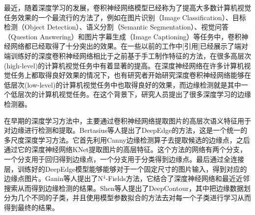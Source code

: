\documentclass[master]{thesis-uestc}
\begin{document}
最近，随着深度学习的发展，卷积神经网络模型已经称为了提高大多数计算机视觉任务效果的一个最流行的方法了，例如在图片识别（Image Classification）、目标检测（Object Detection）、语义分割（Semantic Segmentation）、视觉问答（Question Answering）和图片字幕生成（Image Captioning）等任务中，卷积神经网络都已经取得了十分突出的效果。在一些以前的工作中[引用]已经展示了端对端训练好的深度卷积神经网络相比于之前基于手工制作特征的方法，在很多高层次(high-level)的计算机视觉任务中有着显著的提高。在深度神经网络在许多计算机视觉任务上都取得良好效果的情况下，也有研究者开始研究深度卷积神经网络能够在低层次(low-level)的计算机视觉任务中也取得良好的效果，而边缘检测就是其中一个低层次的计算机视觉任务。在这个背景下，研究人员提出了很多深度学习的边缘检测器。

在早期的深度学习方法中，主要通过卷积神经网络提取图片的高层次语义特征用于对边缘进行检测和提取。Bertasius等人提出了DeepEdge的方法，这是一个统一的多尺度深度学习方法。它首先利用Canny边缘检测算子去提取候选的边缘点，之后通过它的深度神经网络KNet提取图片的高层特征。这个方法的网络有两个分支，一个分支用于回归得到边缘点，一个分支用于分类得到边缘点。最后通过全连接层，训练好的DeepEdge模型能够能够对于一个固定尺寸的图片输入，得到对应的边缘点图片。Ganin等人提出了N$^4$-Fields方法，它结合了深度神经网络和最近近邻搜索从而得到边缘检测的结果。Shen等人提出了DeepContour，其中把边缘数据划分为几个不同的子类，并且使用模型参数拟合的方法去对每一个子类进行学习从而得到最终的结果。
\end{document}
